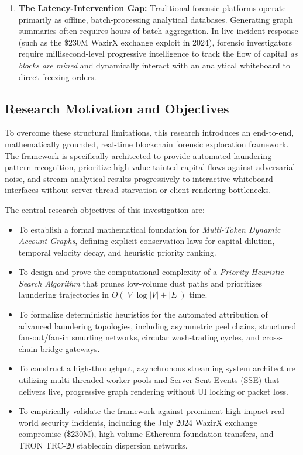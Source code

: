 \begin{enumerate}[label=(\roman*)]
    \item \textbf{The Latency-Intervention Gap:} Traditional forensic platforms operate primarily as offline, batch-processing analytical databases. Generating graph summaries often requires hours of batch aggregation. In live incident response (such as the \$230M WazirX exchange exploit in 2024), forensic investigators require millisecond-level progressive intelligence to track the flow of capital \emph{as blocks are mined} and dynamically interact with an analytical whiteboard to direct freezing orders.
\end{enumerate}

\subsection{Research Motivation and Objectives}

To overcome these structural limitations, this research introduces an end-to-end, mathematically grounded, real-time blockchain forensic exploration framework. The framework is specifically architected to provide automated laundering pattern recognition, prioritize high-value tainted capital flows against adversarial noise, and stream analytical results progressively to interactive whiteboard interfaces without server thread starvation or client rendering bottlenecks.

The central research objectives of this investigation are:
\begin{itemize}
    \item To establish a formal mathematical foundation for \emph{Multi-Token Dynamic Account Graphs}, defining explicit conservation laws for capital dilution, temporal velocity decay, and heuristic priority ranking.
    \item To design and prove the computational complexity of a \emph{Priority Heuristic Search Algorithm} that prunes low-volume dust paths and prioritizes laundering trajectories in $O(|V|\log|V| + |E|)$ time.
    \item To formalize deterministic heuristics for the automated attribution of advanced laundering topologies, including asymmetric peel chains, structured fan-out/fan-in smurfing networks, circular wash-trading cycles, and cross-chain bridge gateways.
    \item To construct a high-throughput, asynchronous streaming system architecture utilizing multi-threaded worker pools and Server-Sent Events (SSE) that delivers live, progressive graph rendering without UI locking or packet loss.
    \item To empirically validate the framework against prominent high-impact real-world security incidents, including the July 2024 WazirX exchange compromise (\$230M), high-volume Ethereum foundation transfers, and TRON TRC-20 stablecoin dispersion networks.
\end{itemize}

